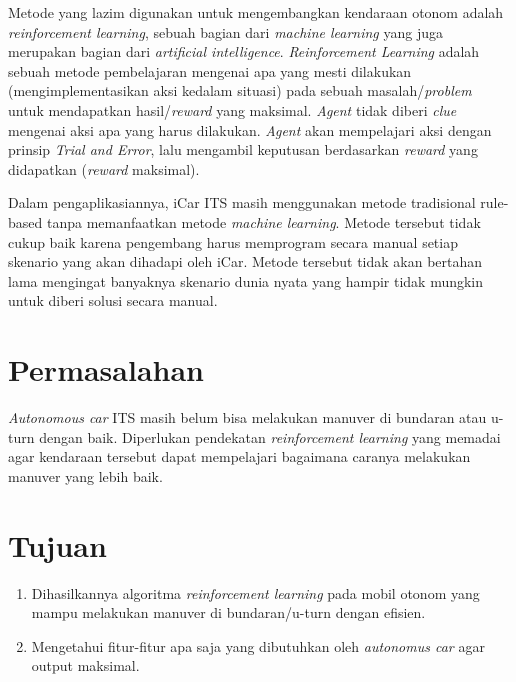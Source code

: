 Metode yang lazim digunakan untuk mengembangkan kendaraan otonom adalah \textit{reinforcement learning}, sebuah bagian dari \textit{machine learning }yang juga merupakan bagian dari \textit{artificial intelligence}. \textit{Reinforcement Learning }adalah sebuah metode pembelajaran mengenai apa yang mesti dilakukan (mengimplementasikan aksi kedalam situasi) pada sebuah masalah/\textit{problem }untuk mendapatkan hasil/\textit{reward }yang maksimal. \textit{Agent }tidak diberi \textit{clue }mengenai aksi apa yang harus dilakukan. \textit{Agent }akan mempelajari aksi dengan prinsip \textit{Trial and Error}, lalu mengambil keputusan berdasarkan \textit{reward }yang didapatkan (\textit{reward }maksimal).

Dalam pengaplikasiannya, iCar ITS masih menggunakan metode tradisional rule-based tanpa memanfaatkan metode \textit{machine learning}. Metode tersebut tidak cukup baik karena pengembang harus memprogram secara manual setiap skenario yang akan dihadapi oleh iCar. Metode tersebut tidak akan bertahan lama mengingat banyaknya skenario dunia nyata yang hampir tidak mungkin untuk diberi solusi secara manual.

\section{Permasalahan}
\label{sec:permasalahan}

\textit{Autonomous car }ITS masih belum bisa melakukan manuver di bundaran atau u-turn dengan baik. Diperlukan pendekatan \textit{reinforcement learning }yang memadai agar kendaraan tersebut dapat mempelajari bagaimana caranya melakukan manuver yang lebih baik.
	


\section{Tujuan}
\label{sec:Tujuan}

\begin{enumerate}[nolistsep]
	\item Dihasilkannya algoritma \textit{reinforcement learning }pada mobil otonom yang mampu melakukan manuver di bundaran/u-turn dengan efisien.
	\item Mengetahui fitur-fitur apa saja yang dibutuhkan oleh \textit{autonomus car }agar output maksimal.
	
	\iffalse
	Dapat dicontohkan seperti dimana lokasi dan berapa derajat kemiringan dari sensor pada kendaraan yang sebaiknya diaplikasikan.
	\fi
	
\end{enumerate}



